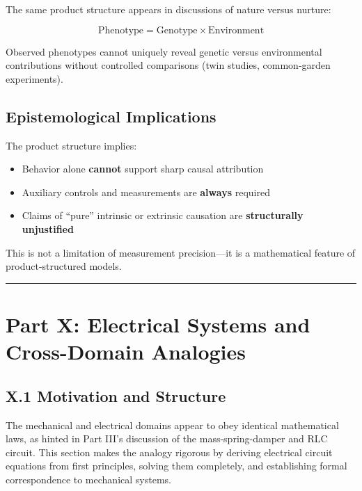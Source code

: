 \documentclass[
]{article}
\providecommand{\tightlist}{%
  \setlength{\itemsep}{0pt}\setlength{\parskip}{0pt}}
\begin{document}
The same product structure appears in discussions of nature versus
nurture:

\[\text{Phenotype} = \text{Genotype} \times \text{Environment}\]

Observed phenotypes cannot uniquely reveal genetic versus environmental
contributions without controlled comparisons (twin studies,
common-garden experiments).

\subsection{Epistemological
Implications}\label{epistemological-implications}

The product structure implies:

\begin{itemize}
\tightlist
\item
  Behavior alone \textbf{cannot} support sharp causal attribution
\item
  Auxiliary controls and measurements are \textbf{always} required
\item
  Claims of ``pure'' intrinsic or extrinsic causation are
  \textbf{structurally unjustified}
\end{itemize}

This is not a limitation of measurement precision---it is a mathematical
feature of product-structured models.

\begin{center}\rule{0.5\linewidth}{0.5pt}\end{center}

\section{Part X: Electrical Systems and Cross-Domain
Analogies}\label{part-x-electrical-systems-and-cross-domain-analogies}

\subsection{X.1 Motivation and
Structure}\label{x.1-motivation-and-structure}

The mechanical and electrical domains appear to obey identical
mathematical laws, as hinted in Part III's discussion of the
mass-spring-damper and RLC circuit. This section makes the analogy
rigorous by deriving electrical circuit equations from first principles,
solving them completely, and establishing formal correspondence to
mechanical systems.
\end{document}
